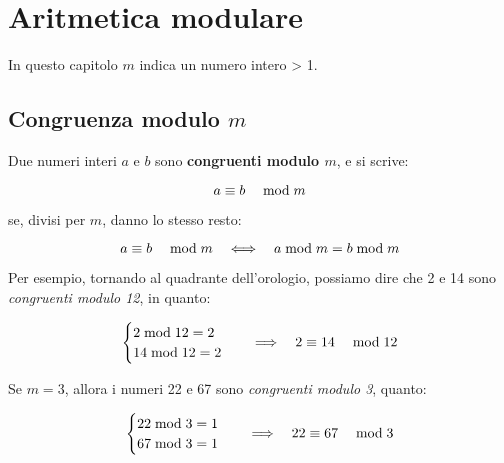 \chapter{Aritmetica modulare}

In questo capitolo $m$ indica un numero intero > 1.

\section{Congruenza modulo $m$}

\begin{mdframed}
    \begin{definizione}
        Due numeri interi $a$ e $b$ sono \textbf{congruenti modulo $m$}, e si scrive:
    
        \begin{equation}
             a \equiv b \quad\bmod m 
        \end{equation}
        
        se, divisi per $m$, danno lo stesso resto:
    
        \begin{equation}
            \label{eq:def_congruenza}  a \equiv b \quad\bmod m   \quad\Longleftrightarrow\quad  a  \bmod  m = b  \bmod  m
        \end{equation}
    
    \end{definizione}
\end{mdframed}

Per esempio, tornando al quadrante dell'orologio, possiamo dire che 2 e 14 sono \emph{congruenti modulo 12}, in quanto:

\begin{equation*}
    \begin{cases}
        2  \bmod  12 = 2 \\
        14  \bmod  12 = 2
    \end{cases}
    \quad\Longrightarrow\quad
     2 \equiv 14 \quad\bmod 12 
\end{equation*}

Se $m = 3$, allora i numeri 22 e 67 sono \emph{congruenti modulo 3}, quanto:

\begin{equation*}
    \begin{cases}
        22  \bmod  3 = 1 \\
        67  \bmod  3 = 1
    \end{cases}
    \quad\Longrightarrow\quad
     22 \equiv 67 \quad\bmod 3 
\end{equation*}

